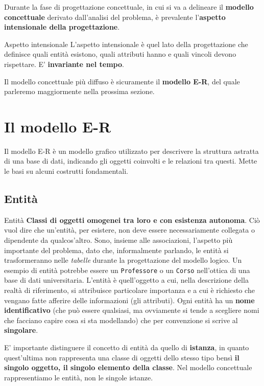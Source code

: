\documentclass[12pt]{report}
\begin{document}
	Durante la fase di progettazione concettuale, in cui si va a delineare il \textbf{modello concettuale} derivato dall'analisi del problema, è prevalente l'\textbf{aspetto intensionale della progettazione}.
	\begin{definizione}{Aspetto intensionale}{}
		L'aspetto intensionale è quel lato della progettazione che definisce quali entità esistono, quali attributi hanno e quali vincoli devono rispettare. E' \textbf{invariante nel tempo}.
	\end{definizione}
	Il modello concettuale più diffuso è sicuramente il \textbf{modello E-R}, del quale parleremo maggiormente nella prossima sezione.
	
	\section{Il modello E-R}
	Il modello E-R è un modello grafico utilizzato per descrivere la struttura astratta di una base di dati, indicando gli oggetti coinvolti e le relazioni tra questi.
	Mette le basi su alcuni costrutti fondamentali.
	
	\subsection{Entità}
	\begin{definizione}{Entità}{}
		\textbf{Classi di oggetti omogenei tra loro e con esistenza autonoma}. Ciò vuol dire che un'entità, per esistere, non deve essere necessariamente collegata o dipendente da qualcos'altro. Sono, insieme alle associazioni, l'aspetto più importante del problema, dato che, informalmente parlando, le entità si trasformeranno nelle \textit{tabelle} durante la progettazione del modello logico. Un esempio di entità potrebbe essere un \texttt{Professore} o un \texttt{Corso} nell'ottica di una base di dati universitaria. L'entità è quell'oggetto a cui, nella descrizione della realtà di riferimento, si attribuisce particolare importanza e a cui è richiesto che vengano fatte afferire delle informazioni (gli attributi).
		\smallbreak
		Ogni entità ha un \textbf{nome identificativo} (che può essere qualsiasi, ma ovviamente si tende a scegliere nomi che facciano capire cosa si sta modellando) che per convenzione si scrive al \textbf{singolare}.
	\end{definizione}
	E' importante distinguere il concetto di entità da quello di \textbf{istanza}, in quanto quest'ultima non rappresenta una classe di oggetti dello stesso tipo bensì \textbf{il singolo oggetto, il singolo elemento della classe}.
	Nel modello concettuale rappresentiamo le entità, non le singole istanze.
	
\end{document}
